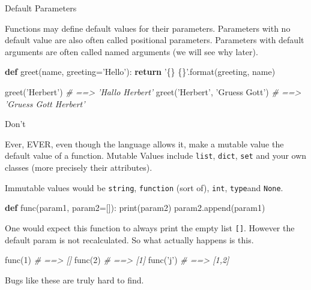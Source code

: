 \documentclass[ignorenonframetext,]{beamer}
\newenvironment{Shaded}{}{}
\newcommand{\KeywordTok}[1]{\textcolor[rgb]{0.00,0.44,0.13}{\textbf{{#1}}}}
\newcommand{\DataTypeTok}[1]{\textcolor[rgb]{0.56,0.13,0.00}{{#1}}}
\newcommand{\DecValTok}[1]{\textcolor[rgb]{0.25,0.63,0.44}{{#1}}}
\newcommand{\StringTok}[1]{\textcolor[rgb]{0.25,0.44,0.63}{{#1}}}
\newcommand{\CommentTok}[1]{\textcolor[rgb]{0.38,0.63,0.69}{\textit{{#1}}}}
\newcommand{\NormalTok}[1]{{#1}}
\begin{document}
\begin{frame}[fragile]{Default Parameters}

Functions may define default values for their parameters. Parameters
with no default value are also often called positional parameters.
Parameters with default arguments are often called named arguments (we
will see why later).

\begin{Shaded}
\begin{Highlighting}[]
\KeywordTok{def} \NormalTok{greet(name, greeting=}\StringTok{'Hello'}\NormalTok{):}
    \KeywordTok{return} \StringTok{'\{\} \{\}'}\NormalTok{.}\DataTypeTok{format}\NormalTok{(greeting, name)}

\NormalTok{greet(}\StringTok{'Herbert'}\NormalTok{)  }\CommentTok{# ==> 'Hallo Herbert'}
\NormalTok{greet(}\StringTok{'Herbert'}\NormalTok{, }\StringTok{'Gruess Gott'}\NormalTok{)  }\CommentTok{# ==> 'Gruess Gott Herbert'}
\end{Highlighting}
\end{Shaded}

\end{frame}

\begin{frame}[fragile]

\begin{block}{Don't}

Ever, EVER, even though the language allows it, make a mutable value the
default value of a function. Mutable Values include \texttt{list},
\texttt{dict}, \texttt{set} and your own classes (more precisely their
attributes).

Immutable values would be \texttt{string}, \texttt{function} (sort of),
\texttt{int}, \texttt{type}and \texttt{None}.

\begin{Shaded}
\begin{Highlighting}[]
\KeywordTok{def} \NormalTok{func(param1, param2=[]):}
    \DataTypeTok{print}\NormalTok{(param2)}
    \NormalTok{param2.append(param1)}
\end{Highlighting}
\end{Shaded}

\end{block}

\end{frame}

\begin{frame}[fragile]

One would expect this function to always print the empty list
\texttt{{[}{]}}. However the default param is not recalculated. So what
actually happens is this.

\begin{Shaded}
\begin{Highlighting}[]
\NormalTok{func(}\DecValTok{1}\NormalTok{)  }\CommentTok{# ==> []}
\NormalTok{func(}\DecValTok{2}\NormalTok{)  }\CommentTok{# ==> [1]}
\NormalTok{func(}\StringTok{'j'}\NormalTok{) }\CommentTok{# ==> [1,2]}
\end{Highlighting}
\end{Shaded}

Bugs like these are truly hard to find.

\end{frame}
\end{document}
